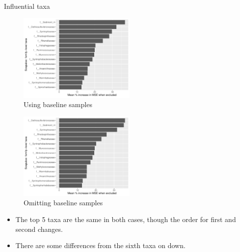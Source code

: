 \documentclass{beamer}
\begin{document}
\begin{frame}{Influential taxa}

  \begin{minipage}{0.47\textwidth}
    \begin{figure}
    \includegraphics[width=2.25in]{RiceRivers/bacteria/use_families/w_scapulae/w_baseline/families_scapula_w_baseline_PercIncMSE_barchart}
    \caption{Using baseline samples}
\end{figure}
\end{minipage}
\begin{minipage}{0.47\textwidth}
  \begin{figure}
    \includegraphics[width=2.25in]{RiceRivers/bacteria/use_families/w_scapulae/no_baseline/families_scap_no_baseline_PercIncMSE_barchart}
    \caption{Omitting baseline samples}
  \end{figure}
  \end{minipage}
  \vspace{0.1in}
  {\scriptsize
  \begin{itemize}
  \item The top 5 taxa are the same in both cases, though the order
    for first and second changes.
  \item There are some differences from the sixth taxa on down.
  \end{itemize}
  }

\end{frame}
\end{document}
